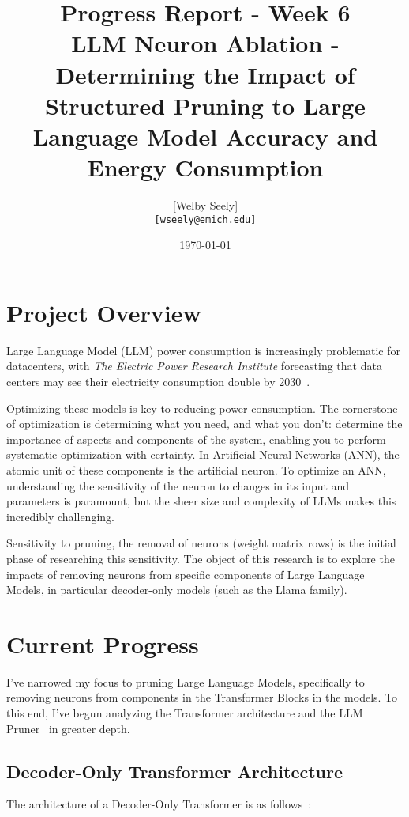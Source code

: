 \documentclass{article}
\title{Progress Report - Week 6 \\
\large LLM Neuron Ablation - Determining the Impact of Structured Pruning to Large Language Model Accuracy and Energy Consumption}
\author{
    [Welby Seely] \\
    \texttt{[wseely@emich.edu]}
}
\date{\today}
\begin{document}
    \maketitle


    \section{Project Overview}\label{sec:project-overview}
    Large Language Model (LLM) power consumption is increasingly problematic for datacenters, with \textit{The Electric Power
    Research Institute} forecasting that data centers may see their electricity consumption double by
    2030~\cite{kindig2024}.

    Optimizing these models is key to reducing power consumption.
    The cornerstone of optimization is determining what you need, and what you don't: determine the importance of
    aspects and components of the system, enabling you to perform systematic optimization with certainty.
    In Artificial Neural Networks (ANN), the atomic unit of these components is the artificial neuron.
    To optimize an ANN, understanding the sensitivity of the neuron to changes in its input and parameters is paramount,
    but the sheer size and complexity of LLMs makes this incredibly challenging.

    Sensitivity to pruning, the removal of neurons (weight matrix rows) is the initial phase of researching this sensitivity.
    The object of this research is to explore the impacts of removing neurons from specific components of Large Language Models, in particular decoder-only models (such as the Llama family).


    \section{Current Progress}\label{sec:current-progress}
    I've narrowed my focus to pruning Large Language Models, specifically to removing neurons from components in the Transformer Blocks in the models.
    To this end, I've begun analyzing the Transformer architecture and the LLM Pruner~\cite{LLM-Pruner} in greater depth.

    \subsection{Decoder-Only Transformer Architecture}\label{subsec:test-harness-correction}

    The architecture of a Decoder-Only Transformer is as follows~\cite{chalvatzaki2023learningreasonscenegraphs}:
\end{document}
